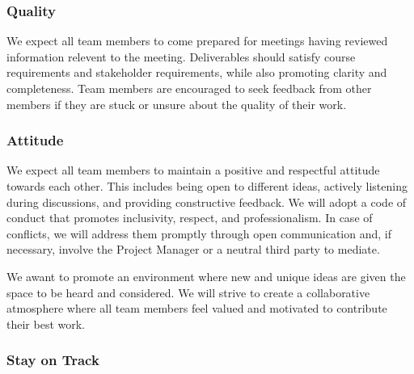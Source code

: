 \documentclass{article}
\begin{document}
\begin{enumerate}
\subsubsection*{Quality} 


We expect all team members to come prepared for meetings having reviewed information relevent to the meeting. Deliverables should satisfy course requirements and stakeholder requirements, while also promoting clarity and completeness.
Team members are encouraged to seek feedback from other members if they are stuck or unsure about the quality of their work.

\subsubsection*{Attitude}


We expect all team members to maintain a positive and respectful attitude towards each other. This includes being open to different ideas, actively listening during discussions, and providing constructive feedback.
We will adopt a code of conduct that promotes inclusivity, respect, and professionalism. In case of conflicts, we will address them promptly through open communication and, if necessary, involve the Project Manager or a neutral third party to mediate.

We awant to promote an environment where new and unique ideas are given the space to be heard and considered. We will strive to create a collaborative atmosphere where all team members feel valued and motivated to contribute their best work.

\subsubsection*{Stay on Track}



\end{enumerate}
\end{document}
